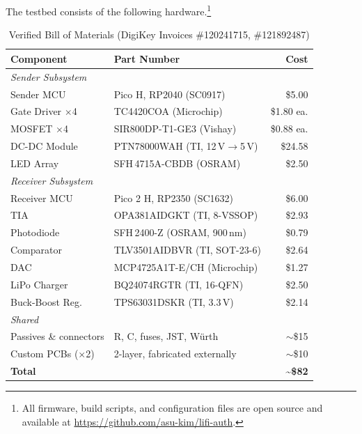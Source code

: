 \documentclass[conference]{IEEEtran}
\begin{document}
The testbed consists of the following hardware.\footnote{All firmware, build scripts, and configuration files are open source and available at \url{https://github.com/asu-kim/lifi-auth}.}

\begin{table}[htbp]
\caption{Verified Bill of Materials (DigiKey Invoices \#120241715, \#121892487)}
\begin{center}
\footnotesize
\begin{tabular}{|p{2.2cm}|p{3.4cm}|r|}
\hline
\textbf{Component} & \textbf{Part Number} & \textbf{Cost} \\
\hline
\multicolumn{3}{|l|}{\textit{Sender Subsystem}} \\
\hline
Sender MCU & Pico H, RP2040 (SC0917) & \$5.00 \\
\hline
Gate Driver $\times$4 & TC4420COA (Microchip) & \$1.80 ea. \\
\hline
MOSFET $\times$4 & SIR800DP-T1-GE3 (Vishay) & \$0.88 ea. \\
\hline
DC-DC Module & PTN78000WAH (TI, 12\,V$\to$5\,V) & \$24.58 \\
\hline
LED Array & SFH\,4715A-CBDB (OSRAM) & \$2.50 \\
\hline
\multicolumn{3}{|l|}{\textit{Receiver Subsystem}} \\
\hline
Receiver MCU & Pico 2 H, RP2350 (SC1632) & \$6.00 \\
\hline
TIA & OPA381AIDGKT (TI, 8-VSSOP) & \$2.93 \\
\hline
Photodiode & SFH\,2400-Z (OSRAM, 900\,nm) & \$0.79 \\
\hline
Comparator & TLV3501AIDBVR (TI, SOT-23-6) & \$2.64 \\
\hline
DAC & MCP4725A1T-E/CH (Microchip) & \$1.27 \\
\hline
LiPo Charger & BQ24074RGTR (TI, 16-QFN) & \$2.50 \\
\hline
Buck-Boost Reg. & TPS63031DSKR (TI, 3.3\,V) & \$2.14 \\
\hline
\multicolumn{3}{|l|}{\textit{Shared}} \\
\hline
Passives \& connectors & R, C, fuses, JST, Würth & $\sim$\$15 \\
\hline
Custom PCBs ($\times$2) & 2-layer, fabricated externally & $\sim$\$10 \\
\hline
\textbf{Total} & & \textbf{\textasciitilde\$82} \\
\hline
\end{tabular}
\label{tab:bom}
\end{center}
\end{table}
\end{document}
